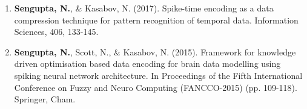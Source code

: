 \begin{tcolorbox}[colback=black!5,colframe=black!40!black,title=Publications]
	\begin{enumerate}
		\item \textbf{Sengupta, N.}, \& Kasabov, N. (2017). Spike-time encoding as a data compression technique for pattern recognition of temporal data. Information Sciences,  406, 133-145.	
		
		\item \textbf{Sengupta, N.}, Scott, N., \& Kasabov, N. (2015). Framework for knowledge driven optimisation based data encoding for brain data modelling using spiking neural network architecture. In Proceedings of the Fifth International Conference on Fuzzy and Neuro Computing (FANCCO-2015) (pp. 109-118). Springer, Cham.
	\end{enumerate}
\end{tcolorbox}